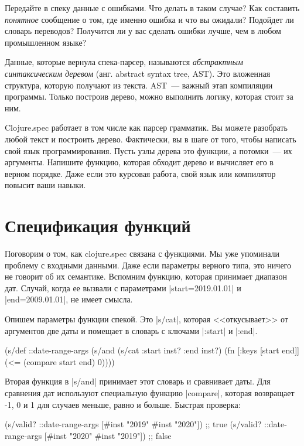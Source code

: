 Передайте в спеку данные с ошибками. Что делать в таком случае? Как составить
\emph{понятное} сообщение о том, где именно ошибка и что вы ожидали? Подойдет ли
словарь переводов? Получится ли у вас сделать ошибки лучше, чем в любом
промышленном языке?

Данные, которые вернула спека-парсер, называются \emph{абстрактным синтаксическим деревом}
(анг. abstract syntax tree, AST). Это вложенная структура, которую получают из текста.
AST~--- важный этап компиляции программы. Только построив дерево, можно выполнить логику,
которая стоит за ним.

Clojure.spec работает в том числе как парсер грамматик. Вы можете разобрать
любой текст и построить дерево. Фактически, вы в шаге от того, чтобы написать
свой язык программирования. Пусть узлы дерева это функции, а потомки~--- их
аргументы. Напишите функцию, которая обходит дерево и вычисляет его в верном
порядке. Даже если это курсовая работа, свой язык или компилятор повысит ваши
навыки.

\section{Спецификация функций}

Поговорим о том, как clojure.spec связана с функциями. Мы уже упоминали проблему
с входными данными. Даже если параметры верного типа, это ничего не говорит об
их семантике. Вспомним функцию, которая принимает диапазон дат. Случай, когда ее
вызвали с параметрами \spverb|start=2019.01.01| и \spverb|end=2009.01.01|, не
имеет смысла.

Опишем параметры функции спекой. Это \spverb|s/cat|, которая <<откусывает>> от
аргументов две даты и помещает в словарь с ключами \spverb|:start| и
\spverb|:end|.

\begin{english}
  \begin{clojure}
(s/def ::date-range-args
  (s/and
   (s/cat :start inst? :end inst?)
   (fn [{:keys [start end]}]
     (<= (compare start end) 0))))
  \end{clojure}
\end{english}

Вторая функция в \spverb|s/and| принимает этот словарь и сравнивает даты. Для
сравнения дат используют специальную функцию \spverb|compare|, которая возвращает
-1, 0 и 1 для случаев меньше, равно и больше. Быстрая проверка:

\begin{english}
  \begin{clojure}
(s/valid? ::date-range-args [#inst "2019" #inst "2020"]) ;; true
(s/valid? ::date-range-args [#inst "2020" #inst "2019"]) ;; false
  \end{clojure}
\end{english}

